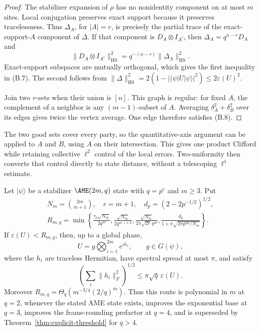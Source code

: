 \begin{proof}
The stabilizer expansion of \(\rho\) has no nonidentity component on at
most \(m\) sites.  Local conjugation preserves exact support because it
preserves tracelessness.  Thus \(\Delta_A\), for \(|A|=r\), is precisely
the partial trace of the exact-support-\(A\) component of \(\Delta\).
If that component is \(D_A\otimes I_{A^c}\), then
\(\Delta_A=q^{n-r}D_A\) and
\[
 \lVert D_A\otimes I_{A^c}\rVert_{\mathrm{HS}}^2
 =q^{-(n-r)}\lVert\Delta_A\rVert_{\mathrm{HS}}^2.
\]
Exact-support subspaces are mutually orthogonal, which gives the first
inequality in (B.7).  The second follows from
\(\lVert\Delta\rVert_{\mathrm{HS}}^2
=2(1-|\langle\psi|U|\psi\rangle|^2)\leq2\varepsilon(U)^2\).

Join two \(r\)-sets when their union is \([n]\).  This graph is regular:
for fixed \(A\), the complement of a neighbor is any \((m-1)\)-subset of
\(A\).  Averaging \(\delta_A^2+\delta_B^2\) over its edges gives twice
the vertex average.  One edge therefore satisfies (B.8).
\end{proof}

The two good sets cover every party, so the quantitative-axis argument can
be applied to \(A\) and \(B\), using \(A\) on their intersection.  This
gives one product Clifford while retaining collective \(\ell^2\) control
of the local errors.  Two-uniformity then converts that control directly
to state distance, without a telescoping \(\ell^1\) estimate.

\begin{theorem}
\label{thm:aggregate-global-rounding}
Let \(\lvert\psi\rangle\) be a stabilizer \(\AME(2m,q)\) state with
\(q=p^e\) and \(m\geq3\).  Put
\[
 \begin{gathered}
 N_m=\binom{2m}{m+1},\quad r=m+1,\quad
 d_p=(2-2p^{-1/2})^{1/2},\\
 R_{m,q}=\min\left\{
 \frac{\tau_p\sqrt{N_m}}{2q^m},
 \frac{\sqrt{N_m}}{2q^{m+1/2}},
 \frac{\sqrt{N_m}}{2\pi\sqrt{2r}\,q^m},
 \frac{d_p}{1+\pi\sqrt{2r q^{2m}/N_m}}
 \right\}.                                             \tag{B.9}
 \end{gathered}
\]
If \(\varepsilon(U)<R_{m,q}\), then, up to a global phase,
\[
 U=g\bigotimes_{i=1}^{2m}e^{ih_i},\qquad g\in G(\psi),
\]
where the \(h_i\) are traceless Hermitian, have spectral spread at most
\(\pi\), and satisfy
\[
 \left(\sum_i\lVert h_i\rVert_F^2\right)^{1/2}
 \leq\pi\sqrt q\,\varepsilon(U).                       \tag{B.10}
\]
Moreover \(R_{m,q}=\Theta_q(m^{-3/4}(2/q)^m)\).  Thus this route is
polynomial in \(m\) at \(q=2\), whenever the stated AME state exists,
improves the exponential base at \(q=3\),
improves the frame-rounding prefactor at \(q=4\), and is superseded by
Theorem~\ref{thm:explicit-threshold} for \(q>4\).
\end{theorem}

